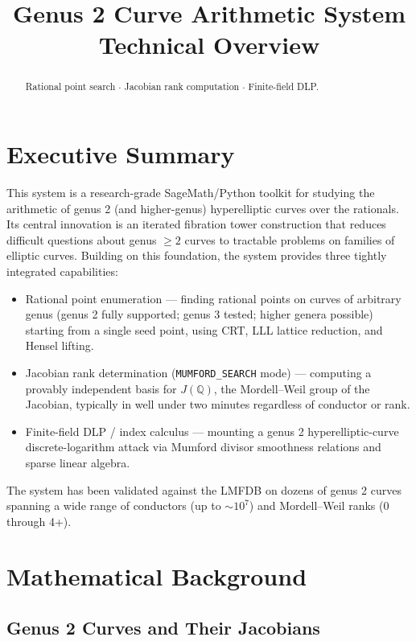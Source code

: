 \documentclass[11pt, a4paper]{article}
\title{\textbf{Genus 2 Curve Arithmetic System} \\ \large Technical Overview}
\author{}
\date{}
\begin{document}
\maketitle

\begin{abstract}
Rational point search $\cdot$ Jacobian rank computation $\cdot$ Finite-field DLP.
\end{abstract}

\section{Executive Summary}

This system is a research-grade SageMath/Python toolkit for studying the arithmetic of genus 2 (and higher-genus) hyperelliptic curves over the rationals. Its central innovation is an iterated fibration tower construction that reduces difficult questions about genus $\geq 2$ curves to tractable problems on families of elliptic curves. Building on this foundation, the system provides three tightly integrated capabilities:

\begin{itemize}[label={\textbullet}]
    \item Rational point enumeration — finding rational points on curves of arbitrary genus (genus 2 fully supported; genus 3 tested; higher genera possible) starting from a single seed point, using CRT, LLL lattice reduction, and Hensel lifting.
    \item Jacobian rank determination (\texttt{MUMFORD\_SEARCH} mode) — computing a provably independent basis for $J(\mathbb{Q})$, the Mordell--Weil group of the Jacobian, typically in well under two minutes regardless of conductor or rank.
    \item Finite-field DLP / index calculus — mounting a genus 2 hyperelliptic-curve discrete-logarithm attack via Mumford divisor smoothness relations and sparse linear algebra.
\end{itemize}

The system has been validated against the LMFDB on dozens of genus 2 curves spanning a wide range of conductors (up to $\sim 10^7$) and Mordell--Weil ranks (0 through 4+).

\section{Mathematical Background}

\subsection{Genus 2 Curves and Their Jacobians}
\end{document}
